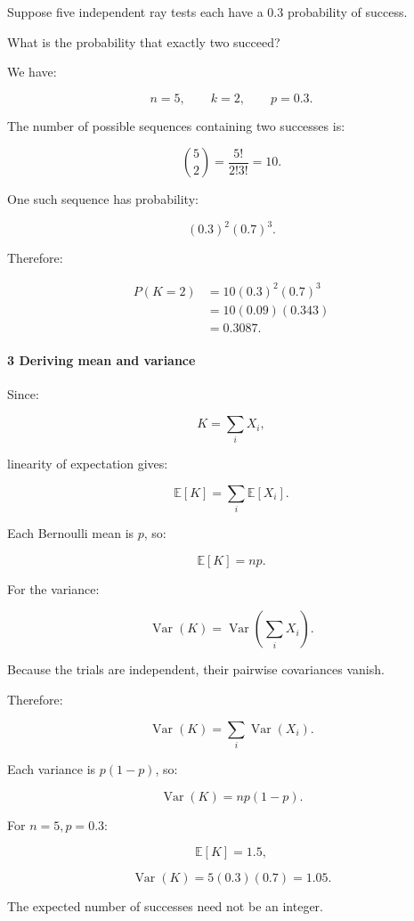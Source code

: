 Suppose five independent ray tests each have a \(0.3\) probability of success.

What is the probability that exactly two succeed?

We have:

\[
 n=5,\qquad k=2,\qquad p=0.3.
\]

The number of possible sequences containing two successes is:

\[
 \binom52=\frac{5!}{2!3!}=10.
\]

One such sequence has probability:

\[
 (0.3)^2(0.7)^3.
\]

Therefore:

\[
 \begin{aligned} P(K=2) &=10(0.3)^2(0.7)^3\\ &=10(0.09)(0.343)\\ &=\boxed{0.3087}. \end{aligned}
\]

\paragraph{3 Deriving mean and variance}\label{deriving-mean-and-variance}

Since:

\[
 K=\sum_iX_i,
\]

linearity of expectation gives:

\[
 \mathbb E[K]=\sum_i\mathbb E[X_i].
\]

Each Bernoulli mean is \(p\), so:

\[
 \boxed{\mathbb E[K]=np}.
\]

For the variance:

\[
 \operatorname{Var}(K) = \operatorname{Var}\left(\sum_iX_i\right).
\]

Because the trials are independent, their pairwise covariances vanish.

Therefore:

\[
 \operatorname{Var}(K)= \sum_i\operatorname{Var}(X_i).
\]

Each variance is \(p(1-p)\), so:

\[
 \boxed{ \operatorname{Var}(K)=np(1-p) }.
\]

For \(n=5,p=0.3\):

\[
 \mathbb E[K]=1.5,
\]

\[
 \operatorname{Var}(K)=5(0.3)(0.7)=1.05.
\]

The expected number of successes need not be an integer.

